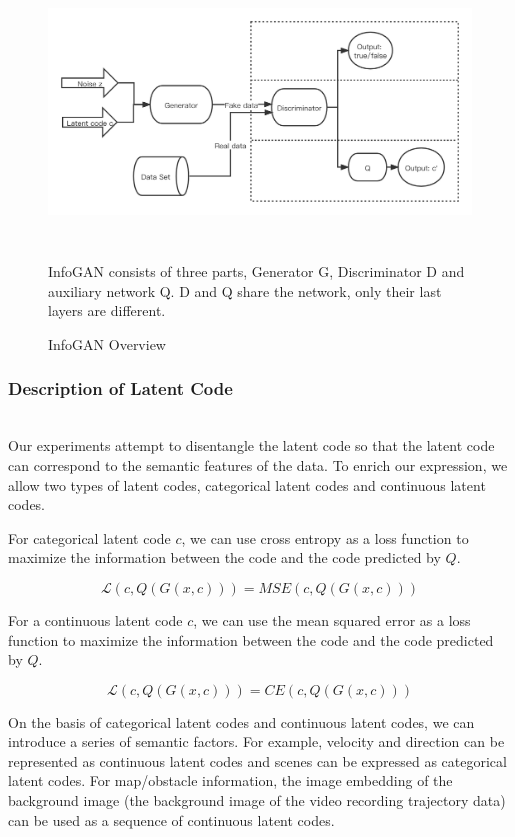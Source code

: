 \begin{figure}[h]
  \centering
  \includegraphics[width=\textwidth, height = 7cm]{figures/infoGAN.png}
  \caption{InfoGAN Overview}{InfoGAN consists of three parts, Generator G, Discriminator D and auxiliary network Q. D and Q share the network, only their last layers are different.}
  \label{infoGan}
\end{figure}
\subsubsection{Description of Latent Code}

\hfill \\
Our experiments attempt to disentangle the latent code so that the latent code can correspond to the semantic features of the data. To enrich our expression, we allow two types of latent codes, categorical latent codes and continuous latent codes.

For categorical latent code $c$, we can use cross entropy as a loss function to maximize the information between the code and the code predicted by $Q$.


$$\mathcal{L} (c, Q(G(x, c))) = MSE(c, Q(G(x, c))) $$

For a continuous latent code $c$, we can use the mean squared error as a loss function to maximize the information between the code and the code predicted by $Q$.

$$\mathcal{L} (c, Q(G(x, c))) = CE(c, Q(G(x, c))) $$

On the basis of categorical latent codes and continuous latent codes, we can introduce a series of semantic factors. For example, velocity and direction can be represented as continuous latent codes and scenes can be expressed as categorical latent codes. For map/obstacle information, the image embedding of the background image (the background image of the video recording trajectory data) can be used as a sequence of continuous latent codes.

